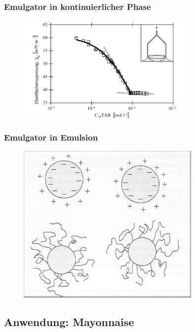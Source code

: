 \documentclass{beamer} %
\begin{document}
\begin{frame}
\frametitle{Emulgator in kontinuierlicher Phase}
\begin{figure}
\centering
\includegraphics[width = 0.8\textwidth]{Oberflachenspannung.JPG}
\end{figure}
\end{frame}



\begin{frame}
\frametitle{Emulgator in Emulsion}
\begin{figure}
\centering
\includegraphics[width = 0.8\textwidth]{Wassertropfen.jpg}
\textcolor{white}{\cite{emulgierzentrifuge}}
\end{figure}
\end{frame}

\subsection{Anwendung: Mayonnaise}
\end{document}
